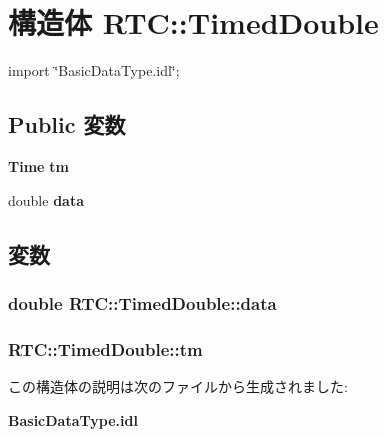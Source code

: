 \section{構造体 RTC::TimedDouble}
\label{structRTC_1_1TimedDouble}


{\ttfamily import \char`\"{}BasicDataType.idl\char`\"{};}

\subsection*{Public 変数}
\begin{DoxyCompactItemize}
\item 
{\bf Time} {\bf tm}
\item 
double {\bf data}
\end{DoxyCompactItemize}


\subsection{変数}
\subsubsection[{data}]{\setlength{\rightskip}{0pt plus 5cm}double {\bf RTC::TimedDouble::data}}\label{structRTC_1_1TimedDouble_acd572c69d2c9ccbf144ea4d3873056d4}
\subsubsection[{tm}]{ {\bf RTC::TimedDouble::tm}}\label{structRTC_1_1TimedDouble_a4bf2f8c22004f0180be307ecda4413e2}


この構造体の説明は次のファイルから生成されました:\begin{DoxyCompactItemize}
\item 
{\bf BasicDataType.idl}\end{DoxyCompactItemize}
